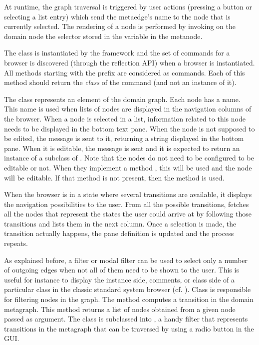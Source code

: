 \documentclass[a4paper,10pt,twoside]{book}
\begin{document}
At runtime, the graph traversal is triggered by user actions (\eg pressing a button or selecting a list entry) which send the metaedge's name to the node that is currently selected. The rendering of a node is performed by invoking on the domain node the selector stored in the variable  in the metanode.

The class  is instantiated by the framework and the set of commands for a browser is discovered (through the \st reflection API) when a browser is instantiated. All methods starting with the  prefix are considered as commands. Each of this method should return the \emph{class} of the command (and not an instance of it).

The class  represents an element of the domain graph. Each node has a name. This name is used when lists of nodes are displayed in the navigation columns of the browser. When a node is selected in a list, information related to this node needs to be displayed in the bottom text pane. 
When the node is not supposed to be edited, the message  is sent to it, returning a string  displayed in the bottom pane. When it is editable, the message  is sent and it is expected to return an instance of a subclass of . Note that the nodes do not need to be configured to be editable or not. When they implement a method , this will be used and the node will be editable. If that method is not present, then the method  is used. 

When the browser is in a state where several transitions are available, it displays the navigation possibilities to the user. From all the possible transitions, \obf fetches all the nodes that represent the states the user could arrive at by following those transitions and lists them in the next column. Once a selection is made, the transition  actually happens, the pane definition is updated and the process repeats.

As explained before, a filter or modal filter can be used to select only a number of outgoing edges when not all of them need to be shown to the user. This is useful for instance to display the instance side, comments, or class side of a particular class in the classic standard system browser (cf. ). Class  is responsible for filtering nodes in the graph. The method  computes a transition in the domain metagraph. This method returns a list of nodes obtained from a given node passed as argument. The class  is subclassed into , a handy filter that represents transitions in the metagraph that can be traversed by using a radio button in the GUI.
\end{document}
